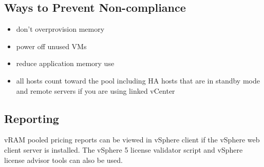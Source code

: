 \subsection{Ways to Prevent Non-compliance}

\begin{itemize}

\item don't overprovision memory

\item power off unused VMs

\item reduce application memory use

\item all hosts count toward the pool including HA hosts that are in standby
mode and remote servers if you are using linked vCenter

\end{itemize}

\subsection{Reporting}

vRAM pooled pricing reports can be viewed in vSphere client if the vSphere
web client server is installed. The vSphere 5 license validator script and
vSphere license advisor tools can also be used.
